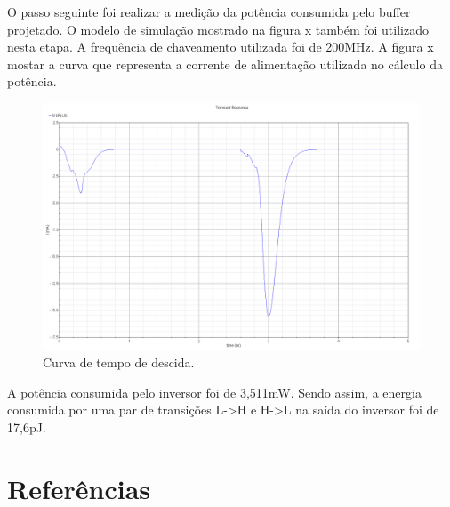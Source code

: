 \documentclass[a4paper,10pt] {article}
\begin{document}
O passo seguinte foi realizar a medição da potência consumida pelo buffer projetado. O modelo de simulação mostrado na figura x também foi utilizado nesta etapa. A frequência de chaveamento utilizada foi de 200MHz. A figura x mostar a curva que representa a corrente de alimentação utilizada no cálculo da potência.

\begin{figure} [h]
	\label{fig:corrente}
	\centering
	\includegraphics[scale=0.1]{Corrente.png}
	\caption{Curva de tempo de descida.}
\end{figure}

A potência consumida pelo inversor foi de 3,511mW. Sendo assim, a energia consumida por uma par de transições L->H e H->L na saída do inversor foi de 17,6pJ.

\section{Referências}
\end{document}
